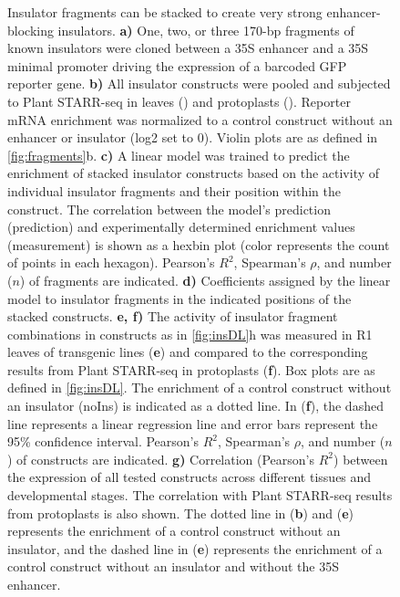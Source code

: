 \documentclass[10pt]{article}
\newcommand{\fignormal}{\scriptsize} %
\newcommand{\usename}[1]{\csname#1\endcsname}
\newif\ifnpc
\newcounter{fig}
\newenvironment{fig}{%
	\begin{figure}[p]%
		\stepcounter{fig}%
		\pdfbookmark{\figurename\ \thefig}{figure\thefig}%
		\tikzsetnextfilename{figure\thefig}%
		\fignormal%
		\centering%
}{%
	\end{figure}%
	\clearpage%
	\ifnpc%
		\makenextpagecaption%
		\global\npcfalse%
	\fi%
}
\newcommand{\titleend}{. }
\newcommand{\nextentry}{ }
\newcommand{\captiontitle}[2][]{#2#1\titleend}
\newif\ifsubfigupper
\newcounter{subfig}[figure]
\newcommand{\subfigrefsep}{\textbf{)}}
\newcommand{\subfigrefand}{, }
\newcommand{\subfigunformatted}[1]{\ifsubfigupper\uppercase{#1}\else\lowercase{#1}\fi}
\newcommand{\plainsubfigref}[1]{\textbf{\subfigunformatted{#1}}}
\newcommand{\subfig}[1]{\textbf{\plainsubfigref{#1}}\subfigrefsep}
\newcommand{\subfigtwo}[2]{\textbf{\plainsubfigref{#1}\subfigrefand\plainsubfigref{#2}}\subfigrefsep}
\newcommand{\parensubfig}[2][]{(#1\plainsubfigref{#2})}
\begin{document}
		\begin{fig}
			\caption{%
				\captiontitle{Insulator fragments can be stacked to create very strong enhancer-blocking insulators}%
				\subfig{A} One, two, or three 170-bp fragments of known insulators were cloned between a \usename{35S} enhancer and a 35S minimal promoter driving the expression of a barcoded GFP reporter gene.\nextentry
				\subfig{B} All insulator constructs were pooled and subjected to Plant STARR-seq in \tobacco leaves (\tobacco) and \maize protoplasts (\maize). Reporter mRNA enrichment was normalized to a control construct without an enhancer or insulator (log2 set to 0). Violin plots are as defined in \cref{fig:fragments}\subfigunformatted{B}.\nextentry
				\subfig{C} A linear model was trained to predict the enrichment of stacked insulator constructs based on the activity of individual insulator fragments and their position within the construct. The correlation between the model's prediction (prediction) and experimentally determined enrichment values (measurement) is shown as a hexbin plot (color represents the count of points in each hexagon). Pearson's $R^2$, Spearman's $\rho$, and number ($n$) of fragments are indicated.\nextentry
				\subfig{D} Coefficients assigned by the linear model to insulator fragments in the indicated positions of the stacked constructs.\nextentry
				\subfigtwo{E}{F} The activity of insulator fragment combinations in constructs as in \cref{fig:insDL}\subfigunformatted{h} was measured in R1 leaves of transgenic \maize lines \parensubfig{E} and compared to the corresponding results from Plant STARR-seq in \maize protoplasts \parensubfig{F}. Box plots are as defined in \cref{fig:insDL}. The enrichment of a control construct without an insulator (noIns) is indicated as a dotted line. In \parensubfig{F}, the dashed line represents a linear regression line and error bars represent the 95\% confidence interval. Pearson's $R^2$, Spearman's $\rho$, and number ($n$) of constructs are indicated.\nextentry
				\subfig{G} Correlation (Pearson's $R^2$) between the expression of all tested constructs across different tissues and developmental stages. The correlation with Plant STARR-seq results from \maize protoplasts is also shown.
				The dotted line in \parensubfig{B} and \parensubfig{E} represents the enrichment of a control construct without an insulator, and the dashed line in \parensubfig{E} represents the enrichment of a control construct without an insulator and without the 35S enhancer.
			}%
			\label{fig:stacking}%
		\end{fig}
		
\end{document}
